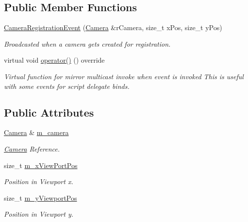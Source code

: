 \subsection*{Public Member Functions}
\begin{DoxyCompactItemize}
\item 
\hyperlink{classCameraRegistrationEvent_a9c432a3e04e803c4230592c9973be50a}{Camera\+Registration\+Event} (\hyperlink{classCamera}{Camera} \&r\+Camera, size\+\_\+t x\+Pos, size\+\_\+t y\+Pos)
\begin{DoxyCompactList}\small\item\em Broadcasted when a camera gets created for registration. \end{DoxyCompactList}\item 
\mbox{\label{classCameraRegistrationEvent_a4134a5ad8c55691d0408e8259dfd2959}} 
virtual void \hyperlink{classCameraRegistrationEvent_a4134a5ad8c55691d0408e8259dfd2959}{operator()} () override
\begin{DoxyCompactList}\small\item\em Virtual function for mirror multicast invoke when event is invoked This is useful with some events for script delegate binds. \end{DoxyCompactList}\end{DoxyCompactItemize}
\subsection*{Public Attributes}
\begin{DoxyCompactItemize}
\item 
\mbox{\label{classCameraRegistrationEvent_ac49a8e11a215f7b21078e0fa6d496ad3}} 
\hyperlink{classCamera}{Camera} \& \hyperlink{classCameraRegistrationEvent_ac49a8e11a215f7b21078e0fa6d496ad3}{m\+\_\+camera}
\begin{DoxyCompactList}\small\item\em \hyperlink{classCamera}{Camera} Reference. \end{DoxyCompactList}\item 
\mbox{\label{classCameraRegistrationEvent_a903f23fc19015e14b309974c88783c14}} 
size\+\_\+t \hyperlink{classCameraRegistrationEvent_a903f23fc19015e14b309974c88783c14}{m\+\_\+x\+View\+Port\+Pos}
\begin{DoxyCompactList}\small\item\em Position in Viewport x. \end{DoxyCompactList}\item 
\mbox{\label{classCameraRegistrationEvent_a08e44509bad3f046e5ca458c309345d8}} 
size\+\_\+t \hyperlink{classCameraRegistrationEvent_a08e44509bad3f046e5ca458c309345d8}{m\+\_\+y\+Viewport\+Pos}
\begin{DoxyCompactList}\small\item\em Position in Viewport y. \end{DoxyCompactList}\end{DoxyCompactItemize}
